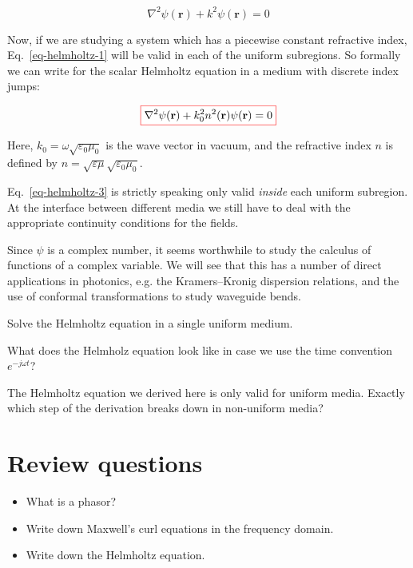 \begin{equation}
\nabla^2 \psi({\mathbf r}) + k^2 \psi({\mathbf r}) = 0 \label{eq-helmholtz-1}
\end{equation}

Now, if we are studying a system which has a piecewise constant refractive index, Eq.~\ref{eq-helmholtz-1} will be valid in each of the uniform subregions. So formally we can write for the scalar Helmholtz equation in a medium with discrete index jumps:

\begin{equation}
\fbox{$\displaystyle \nabla^2 \psi({\mathbf r}) + k_0^2 n^2({\mathbf r}) \psi({\mathbf r}) = 0
\label{eq-helmholtz-3}$}
\end{equation}

Here, $k_0=\omega \sqrt{\varepsilon_0 \mu_0}$ is the wave vector in vacuum, and the refractive index $n$ is defined by $n=\sqrt{\varepsilon \mu} \sqrt{\varepsilon_0 \mu_0}$.

Eq.~\ref{eq-helmholtz-3} is strictly speaking only valid \emph{inside} each uniform subregion. At the interface between different media we still have to deal with the appropriate continuity conditions for the fields.

Since $\psi$ is a complex number, it seems worthwhile to study the calculus of functions of a complex variable. We will see that this has a number of direct applications in photonics, e.g. the Kramers--Kronig dispersion relations, and the use of conformal transformations to study waveguide bends.

\begin{exer}
Solve the Helmholtz equation in a single uniform medium.
\end{exer}

\begin{exer}
What does the Helmholz equation look like in case we use the time convention  $e^{-j \omega t}$? 
\end{exer}

\begin{exer}
The Helmholtz equation we derived here is only valid for uniform media. Exactly which step of the derivation breaks down in non-uniform media?
\end{exer}

\section*{Review questions}

\begin{itemize}
\item What is a phasor?
\item Write down Maxwell's curl equations in the frequency domain.
\item Write down the Helmholtz equation.
\end{itemize}



